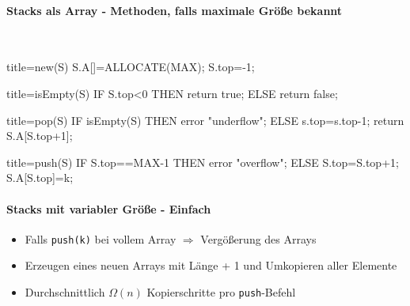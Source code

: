 \documentclass[
    ngerman,
    color=3b,
    dark_mode,
    load_common, %
    summary,
    boxarc,
]{rubos-tuda-template}
\begin{document}
\paragraph{Stacks als Array - Methoden, falls maximale Grö\ss{}e bekannt}\mbox{}\\
\begin{minipage}[t]{.5\textwidth}\mbox{}
    \begin{codeBlock}[autogobble]{title=new(S)}
        S.A[]=ALLOCATE(MAX);
        S.top=-1;
    \end{codeBlock}
\end{minipage}
\begin{minipage}[t]{.5\textwidth}\mbox{}
    \begin{codeBlock}[autogobble]{title=isEmpty(S)}
        IF S.top<0 THEN
          return true;
        ELSE
          return false;
    \end{codeBlock}
\end{minipage}
\begin{minipage}[t]{.5\textwidth}\mbox{}
    \begin{codeBlock}[autogobble]{title=pop(S)}
        IF isEmpty(S) THEN
          error "underflow";
        ELSE
          s.top=s.top-1;
          return S.A[S.top+1];
    \end{codeBlock}
\end{minipage}
\begin{minipage}[t]{.5\textwidth}\mbox{}
    \begin{codeBlock}[autogobble]{title=push(S)}
        IF S.top==MAX-1 THEN
          error "overflow";
        ELSE
          S.top=S.top+1;
          S.A[S.top]=k;
    \end{codeBlock}
\end{minipage}

\paragraph{Stacks mit variabler Grö\ss{}e - Einfach}
\begin{itemize}
    \item Falls \texttt{push(k)} bei vollem Array $\Rightarrow$ Vergö\ss{}erung des Arrays
    \item Erzeugen eines neuen Arrays mit Länge + 1 und Umkopieren aller Elemente
    \item Durchschnittlich $\Omega(n)$ Kopierschritte pro \texttt{push}-Befehl
\end{itemize}
\clearpage
\end{document}
